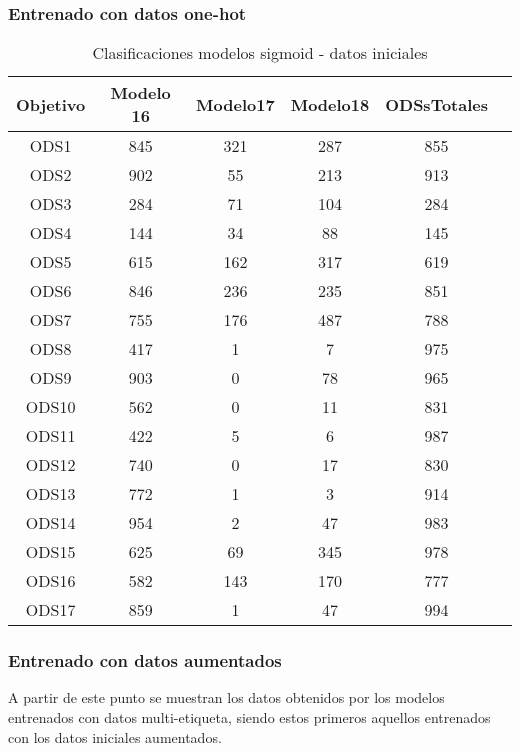 \subsubsection{Entrenado con datos one-hot}
\begin{table}[H]
    \begin{tabular}{| c || c | c  | c  | c  | c |}
        \hline
        Objetivo & Modelo 16 & Modelo17 & Modelo18 & ODSsTotales\\
        \hline \hline
        ODS1   & 845 & 321 & 287 & 855\\ \hline
        ODS2   & 902 & 55  & 213 & 913\\ \hline
        ODS3   & 284 & 71  & 104 & 284\\ \hline
        ODS4   & 144 & 34  & 88  & 145\\ \hline
        ODS5   & 615 & 162 & 317 & 619\\ \hline
        ODS6   & 846 & 236 & 235 & 851\\ \hline
        ODS7   & 755 & 176 & 487 & 788\\ \hline
        ODS8   & 417 & 1   & 7   & 975\\ \hline
        ODS9   & 903 & 0   & 78  & 965\\ \hline
        ODS10  & 562 & 0   & 11  & 831\\ \hline
        ODS11  & 422 & 5   & 6   & 987\\ \hline
        ODS12  & 740 & 0   & 17  & 830\\ \hline
        ODS13  & 772 & 1   & 3   & 914\\ \hline
        ODS14  & 954 & 2   & 47  & 983\\ \hline
        ODS15  & 625 & 69  & 345 & 978\\ \hline
        ODS16  & 582 & 143 & 170 & 777\\ \hline
        ODS17  & 859 & 1   & 47  & 994\\ \hline
    \end{tabular}
    \caption{Clasificaciones modelos sigmoid - datos iniciales}
    \label{table:Clasificaciones modelos sigmoid - datos iniciales}
\end{table}


\subsubsection{Entrenado con datos aumentados}
A partir de este punto se muestran los datos obtenidos por los modelos
entrenados con datos multi-etiqueta, siendo estos primeros aquellos entrenados
con los datos iniciales aumentados.

